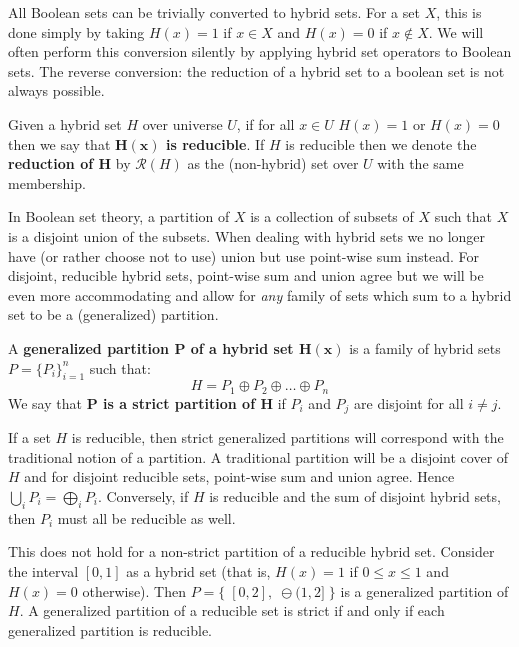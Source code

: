 All Boolean sets can be trivially converted to hybrid sets.
For a set $X$, this is done simply by taking $H(x)=1$ if $x \in X$ and $H(x)=0$ if $x \notin X$.
We will often perform this conversion silently by applying hybrid set operators to Boolean sets.
The reverse conversion: the reduction of a hybrid set to a boolean set is not always possible.


\begin{definition}
	Given a hybrid set $H$ over universe $U$, 
	if for all $x \in U$ $H(x)=1$ or $H(x)=0$ then we say that \textbf{$\boldsymbol{H(x)}$ is reducible}.
	If $H$ is reducible then we denote the \textbf{reduction of $\boldsymbol{H}$} by $\mathcal{R}(H)$ 
	as the (non-hybrid) set over $U$ with the same membership.  
\end{definition}


In Boolean set theory, a partition of $X$ is a collection of subsets of $X$ such that $X$ is a disjoint union of the subsets.
When dealing with hybrid sets we no longer have (or rather choose not to use) union but use point-wise sum instead.
For disjoint, reducible hybrid sets, point-wise sum and union agree but we will be even more accommodating 
and allow for \emph{any} family of sets which sum to a hybrid set to be a (generalized) partition.


\begin{definition}
	A \textbf{generalized partition $\boldsymbol{P}$ of a hybrid set $\boldsymbol{H(x)}$} is a family of hybrid sets
	${P=\{P_i \}_{i=1}^n}$ such that:
	\begin{equation}
		H = P_1 \oplus P_2 \oplus \ldots \oplus P_n
	\end{equation}
	We say that \textbf{$\boldsymbol{P}$ is a strict partition of $\boldsymbol{H}$} if 
	$P_i$ and $P_j$ are disjoint for all $i \neq j$.
\end{definition}


If a set $H$ is reducible, then strict generalized partitions will correspond with the traditional notion of a partition.
A traditional partition will be a disjoint cover of $H$ and for disjoint reducible sets, point-wise sum and union agree.
Hence $\bigcup_i P_i = \bigoplus_i P_i$. 
Conversely, if $H$ is reducible and the sum of disjoint hybrid sets, then $P_i$ must all be reducible as well.


This does not hold for a non-strict partition of a reducible hybrid set.
Consider the interval $[0,1]$ as a hybrid set (that is, $H(x)=1$ if $0 \leq x \leq 1$ and $H(x)=0$ otherwise).
Then $P = \big\{\; [0,2], \;\ominus (1,2] \; \big\}$ is a generalized partition of $H$. 
A generalized partition of a reducible set is strict if and only if each generalized partition is reducible.





